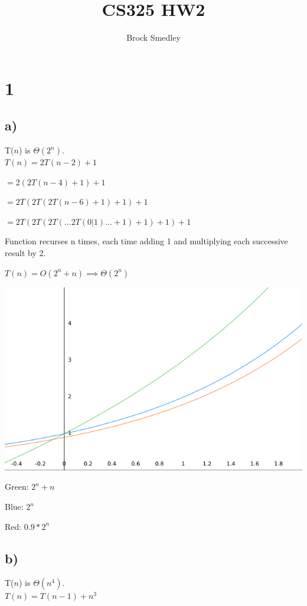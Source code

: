 \documentclass[10pt,a4paper]{report}
\title{CS325 HW2}
\author{Brock Smedley}
\begin{document}
	\maketitle
	
	\section*{1}
	
	\subsection*{a)}
	T($n$) is $\Theta(2^n)$.
	\\
	
	$T(n) 	= 2T(n-2) + 1$
	
	$		= 2(2T(n-4) + 1) + 1$
	
	$		= 2T(2T(2T(n-6) + 1) + 1) + 1$
	
	$		= 2T(2T(2T(...2T(0|1)...+1)+1)+1)+1$

	Function recurses n times, each time adding 1 and multiplying each successive result by 2.

	$T(n)	= O(2^n + n) \implies \Theta(2^n)$
	
	\includegraphics*[scale=0.5]{1a}
	
	Green: $2^n + n$
	
	Blue: $2^n$
	
	Red: $0.9*2^n$
	
	\subsection*{b)}
	T($n$) is $\Theta(n^4)$. 
	\\
	
	$T(n) 	= T(n-1) + n^3$
	
\end{document}

